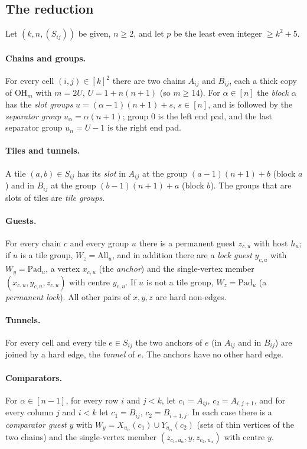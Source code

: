 \subsection{The reduction}\label{sec:hred}
Let $(k,n,(S_{ij}))$ be given, $n\ge2$, and let $p$ be the least even integer $\ge k^2+5$.

\paragraph{Chains and groups.} For every cell $(i,j)\in[k]^2$ there are two chains $A_{ij}$ and $B_{ij}$, each a thick copy of $\mathrm{OH}_m$ with $m=2U$, $U=1+n(n+1)$ (so $m\ge14$). For $\alpha\in[n]$ the \emph{block} $\alpha$ has the \emph{slot groups} $u=(\alpha-1)(n+1)+s$, $s\in[n]$, and is followed by the \emph{separator group} $u_\alpha=\alpha(n+1)$; group $0$ is the left end pad, and the last separator group $u_n=U-1$ is the right end pad.

\paragraph{Tiles and tunnels.} A tile $(a,b)\in S_{ij}$ has its \emph{slot} in $A_{ij}$ at the group $(a-1)(n+1)+b$ (block $a$) and in $B_{ij}$ at the group $(b-1)(n+1)+a$ (block $b$). The groups that are slots of tiles are \emph{tile groups}.

\paragraph{Guests.} For every chain $c$ and every group $u$ there is a permanent guest $z_{c,u}$ with host $h_u$; if $u$ is a tile group, $W_z=\mathrm{All}_u$, and in addition there are a \emph{lock guest} $y_{c,u}$ with $W_y=\mathrm{Pad}_u$, a vertex $x_{c,u}$ (the \emph{anchor}) and the single-vertex member $(x_{c,u},y_{c,u},z_{c,u})$ with centre $y_{c,u}$. If $u$ is not a tile group, $W_z=\mathrm{Pad}_u$ (a \emph{permanent lock}). All other pairs of $x,y,z$ are hard non-edges.

\paragraph{Tunnels.} For every cell and every tile $e\in S_{ij}$ the two anchors of $e$ (in $A_{ij}$ and in $B_{ij}$) are joined by a hard edge, the \emph{tunnel} of $e$. The anchors have no other hard edge.

\paragraph{Comparators.} For $\alpha\in[n-1]$, for every row $i$ and $j<k$, let $c_1=A_{ij}$, $c_2=A_{i,j+1}$, and for every column $j$ and $i<k$ let $c_1=B_{ij}$, $c_2=B_{i+1,j}$. In each case there is a \emph{comparator guest} $y$ with $W_y=X_{u_\alpha}(c_1)\cup Y_{u_\alpha}(c_2)$ (sets of thin vertices of the two chains) and the single-vertex member $(z_{c_1,u_\alpha},y,z_{c_2,u_\alpha})$ with centre $y$.

